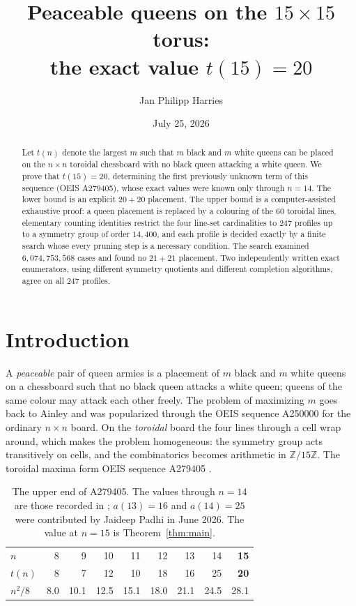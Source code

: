 \documentclass[11pt]{amsart}
\title[Peaceable queens on the $15\times 15$ torus]{Peaceable queens on the $15\times 15$ torus:\\ the exact value $t(15)=20$}
\author{Jan Philipp Harries}
\date{July 25, 2026}
\theoremstyle{remark}
\newcommand{\Z}{\mathbb{Z}}
\newcommand{\Zn}{\Z/15\Z}
\begin{document}
\begin{abstract}
Let $t(n)$ denote the largest $m$ such that $m$ black and $m$ white queens can be placed on the $n\times n$ toroidal chessboard with no black queen attacking a white queen. We prove that $t(15)=20$, determining the first previously unknown term of this sequence (OEIS A279405), whose exact values were known only through $n=14$. The lower bound is an explicit $20+20$ placement. The upper bound is a computer-assisted exhaustive proof: a queen placement is replaced by a colouring of the $60$ toroidal lines, elementary counting identities restrict the four line-set cardinalities to $247$ profiles up to a symmetry group of order $14{,}400$, and each profile is decided exactly by a finite search whose every pruning step is a necessary condition. The search examined $6{,}074{,}753{,}568$ cases and found no $21+21$ placement. Two independently written exact enumerators, using different symmetry quotients and different completion algorithms, agree on all $247$ profiles.
\end{abstract}

\maketitle

\section{Introduction}\label{sec:intro}

A \emph{peaceable} pair of queen armies is a placement of $m$ black and $m$ white queens on a chessboard such that no black queen attacks a white queen; queens of the same colour may attack each other freely. The problem of maximizing $m$ goes back to Ainley \cite{Ainley77} and was popularized through the OEIS sequence A250000 for the ordinary $n\times n$ board. On the \emph{toroidal} board the four lines through a cell wrap around, which makes the problem homogeneous: the symmetry group acts transitively on cells, and the combinatorics becomes arithmetic in $\Zn$. The toroidal maxima form OEIS sequence A279405 \cite{OEIS279405}.

\begin{table}[h]
\centering
\begin{tabular}{@{}l*{8}{r}@{}}
\toprule
$n$      & 8 & 9 & 10 & 11 & 12 & 13 & 14 & \textbf{15}\\
$t(n)$   & 8 & 7 & 12 & 10 & 18 & 16 & 25 & \textbf{20}\\
$n^2/8$  & 8.0 & 10.1 & 12.5 & 15.1 & 18.0 & 21.1 & 24.5 & 28.1\\
\bottomrule
\end{tabular}
\medskip
\caption{The upper end of A279405. The values through $n=14$ are those recorded in \cite{OEIS279405}; $a(13)=16$ and $a(14)=25$ were contributed by Jaideep Padhi in June 2026. The value at $n=15$ is Theorem~\ref{thm:main}.}\label{tab:oeis}
\end{table}
\end{document}
